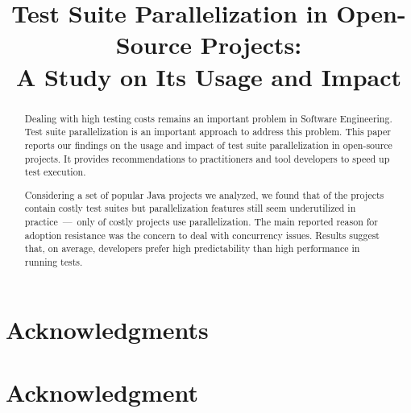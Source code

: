 \documentclass[conference]{IEEEtran}
\begin{document}
\title{Test Suite Parallelization in Open-Source Projects:\\ A Study on Its Usage and Impact}

\author{
}

\maketitle
\thispagestyle{plain}
\pagestyle{plain}

\begin{abstract}
Dealing with high testing costs remains an important problem in
Software Engineering.  Test suite parallelization is an important
approach to address this problem.  This paper reports our findings on
the usage and impact of test suite parallelization in open-source
projects. It provides recommendations to practitioners and
tool developers to speed up test execution.

Considering a set of \numSubjs{} popular Java projects we analyzed, we
found that \percentMedLongRunning{} of the projects contain costly
test suites but parallelization features still seem underutilized in
practice~---~only \percentParallelUpdated{} of costly projects use
parallelization.  The main reported reason for adoption resistance was
the concern to deal with concurrency issues.  Results suggest that, on
average, developers prefer high predictability than high performance
in running tests.
\end{abstract}

\IEEEpeerreviewmaketitle










\ifCLASSOPTIONcompsoc
\section*{Acknowledgments}
\else
\section*{Acknowledgment}
\fi
\end{document}
